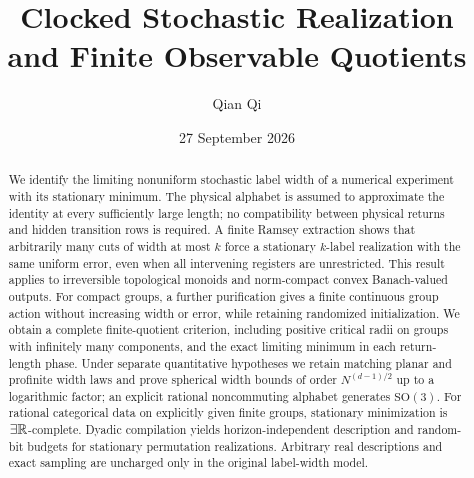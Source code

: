 \documentclass[11pt]{amsart}
\title[Clocked realization and finite quotients]{Clocked Stochastic Realization\\and Finite Observable Quotients}
\author{Qian Qi}
\date{27 September 2026}
\numberwithin{equation}{section}
\theoremstyle{definition}\newtheorem{definition}[theorem]{Definition}
\theoremstyle{remark}\newtheorem{remark}[theorem]{Remark}
\begin{document}
\begin{abstract}
We identify the limiting nonuniform stochastic label width of a numerical experiment with its stationary minimum. The physical alphabet is assumed to approximate the identity at every sufficiently large length; no compatibility between physical returns and hidden transition rows is required. A finite Ramsey extraction shows that arbitrarily many cuts of width at most $k$ force a stationary $k$-label realization with the same uniform error, even when all intervening registers are unrestricted. This result applies to irreversible topological monoids and norm-compact convex Banach-valued outputs. For compact groups, a further purification gives a finite continuous group action without increasing width or error, while retaining randomized initialization. We obtain a complete finite-quotient criterion, including positive critical radii on groups with infinitely many components, and the exact limiting minimum in each return-length phase. Under separate quantitative hypotheses we retain matching planar and profinite width laws and prove spherical width bounds of order $N^{(d-1)/2}$ up to a logarithmic factor; an explicit rational noncommuting alphabet generates $\mathrm{SO}(3)$. For rational categorical data on explicitly given finite groups, stationary minimization is $\exists\mathbb R$-complete. Dyadic compilation yields horizon-independent description and random-bit budgets for stationary permutation realizations. Arbitrary real descriptions and exact sampling are uncharged only in the original label-width model.
\end{abstract}
\maketitle
















\end{document}
